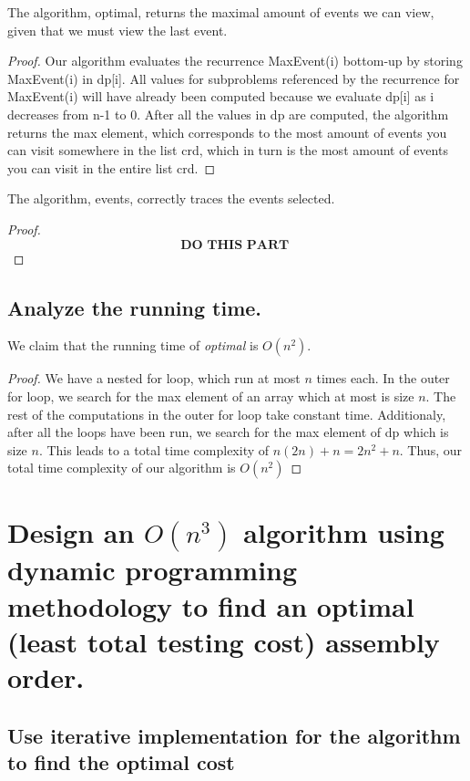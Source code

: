 \documentclass[11pt]{scrartcl}
\begin{document}
\begin{corollary*}
	The algorithm, optimal, returns the maximal amount of events we can view, given that we must view the last event.

	\begin{proof}
		Our algorithm evaluates the recurrence MaxEvent(i) bottom-up by storing MaxEvent(i) in dp[i].
		All values for subproblems referenced by the recurrence for MaxEvent(i) will have already been computed
		because we evaluate dp[i] as i decreases from n-1 to 0.
		After all the values in dp are computed, the algorithm returns the max element,
		which corresponds to the most amount of events you can visit somewhere in the list crd,
		which in turn is the most amount of events you can visit in the entire list crd.
	\end{proof}

\end{corollary*}

\begin{corollary*}
	The algorithm, events, correctly traces the events selected.
	\begin{proof}
		$$\textbf{DO THIS PART }$$
	\end{proof}
\end{corollary*}


\subsection{
	Analyze the running time.
}
We claim that the running time of \textit{optimal} is $O(n^2)$.
\begin{proof}
	We have a nested for loop, which run at most $n$ times each.
	In the outer for loop, we search for the max element of an array
	which at most is size $n$. The rest of the computations in the outer for loop take constant time.
	Additionaly, after all the loops have been run, we search for the max element of dp which is
	size $n$. This leads to a total time complexity of $n(2n) + n = 2n^2 + n$.
	Thus, our total time complexity of our algorithm is $O(n^2)$
\end{proof}


\section{Design an $O(n^3)$ algorithm using dynamic programming methodology to find an optimal
  (least total testing cost) assembly order.}
\subsection{
	Use iterative implementation for the algorithm to find the optimal cost
}
\end{document}
